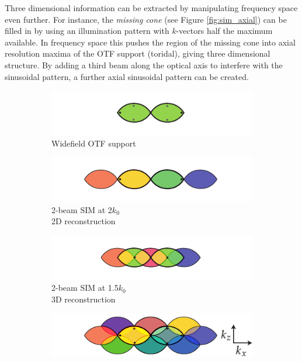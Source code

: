 Three dimensional information can be extracted by manipulating frequency space even further.
For instance, the \emph{missing cone} (see Figure \ref{fig:sim_axial}) can be filled in by using an illumination pattern with $k$-vectors half the maximum available.
In frequency space this pushes the region of the missing cone into axial resolution maxima of the OTF support (toridal), giving three dimensional structure.
By adding a third beam along the optical axis to interfere with the sinusoidal pattern, a further axial sinusoidal pattern can be created.
\begin{figure}
    \centering
    \begin{subfigure}{0.48\textwidth}
        \centering
        \includegraphics{./sim/axial_otf}
        \caption{Widefield OTF support}
        \label{fig:sim_axial_otf}
    \end{subfigure}
    \begin{subfigure}{0.48\textwidth}
        \centering
        \includegraphics{./sim/axial_2_beam_2d}
        \caption{2-beam SIM at \SI{2}{\times}$k_0$\\2D reconstruction}
        \label{fig:sim_axial_2_beam_2d}
    \end{subfigure}
    \begin{subfigure}{0.48\textwidth}
        \centering
        \includegraphics{./sim/axial_2_beam_3d}
        \caption{2-beam SIM at \SI{1.5}{\times}$k_0$\\3D reconstruction}
        \label{fig:sim_axial_2_beam_3d}
    \end{subfigure}
    \begin{subfigure}{0.48\textwidth}
        \centering
        \includegraphics{./sim/axial_3_beam}

\end{subfigure}
\end{figure}
